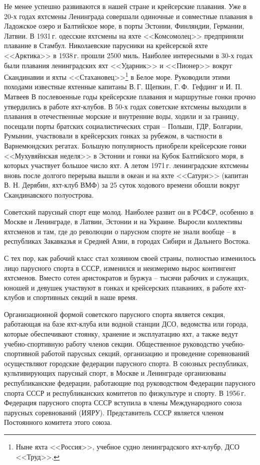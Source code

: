\documentclass[a4paper, 12pt, twoside, final]{scrbook}
\begin{document}
Не менее успешно развиваются в нашей стране и крейсерские плавания.
Уже в 20-х годах яхтсмены Ленинграда совершали одиночные и совместные
плавания в Ладожское озеро и Балтийское море, в порты Эстонии, Финляндии,
Германии, Латвии. В 1931\,г. одесские яхтсмены на яхте <<Комсомолец>>
предприняли плавание в Стамбул. Николаевские парусники на крейсерской
яхте <<Арктика>> в 1938\,г. прошли 2500 миль. Наиболее интересными в
30-х годах были плавания ленинградских яхт <<Ударник>> и <<Пионер>> вокруг
Скандинавии и яхты <<Стахановец>>\footnote{Ныне яхта <<Россия>>, учебное судно ленинградского яхт-клубр, ДСО <<Труд>>.}
в Белое море. Руководили этими походами известные яхтенные капитаны
В.\,Г. Щепкин, Г.\,Ф.~Гефдинг и И. П. Матвеев В послевоенные годы крейсерские
плавания и маршрутные гонки прочно утвердились в работе яхт-клубов.
В 50-х годах советские яхтсмены выходили в плавания в отечественные
морские и внутренние воды, ходили и за границу, посещали порты братских
социалистических стран \--- Польши, ГДР, Болгарии, Румынии, участвовали
в крейсерских гонках за рубежом, в частности в Варнемюндских регатах.
Большую популярность приобрели крейсерские гонки <<Мухувяйнская неделя>>
в Эстонии и гонки на Кубок Балтийского моря, в которых участвует большое
число яхт. А летом 1971\,г. ленинградские яхтсмены вновь после долгого
перерыва вышли в океан и на яхте <<Сатурн>> (капитан В. Н. Дерябин,
яхт-клуб ВМФ) за 25 суток ходового времени обошли вокруг Скандинавского
полуострова. 

Советский парусный спорт еще молод. Наиболее развит он в РСФСР, особенно
в Москве и Ленинграде, в Латвии, Эстонии и на Украине. Выросли коллективы
яхтсменов и там, где до революции о парусном спорте не знали вообще \--- в республиках Закавказья и Средней Азии, в городах Сибири и Дальнего
Востока.

С тех пор, как рабочий класс стал хозяином своей страны, полностью
изменилось лицо парусного спорта в СССР, изменился и неизмеримо вырос
контингент яхтсменов. Вместо сотен аристократов и буржуа \--- тысячи
рабочих и служащих, юношей и девушек участвуют в гонках и крейсерских
плаваниях, в работе яхт-клубов и спортивных секций в наше время.

Организационной формой советского парусного спорта является секция,
работающая на базе яхт-клуба или водной станции ДСО, ведомства или
города, которые обеспечивают стоянку, хранение и эксплуатацию яхт,
а также ведут учебно-спортивную работу членов секции. Общественное
руководство учебно-спортивной работой парусных секций, организацию
и проведение соревнований осуществляют городские федерации парусного
спорта. В союзных республиках, культивирующих парусный спорт, в Москве
и Ленинграде организованы республиканские федерации, работающие под
руководством Федерации парусного спорта СССР и республиканских комитетов
по физкультуре и спорту. В 1956\,г. Федерация парусного спорта СССР
вступила в члены Международного союза парусных соревнований (ИЯРУ).
Представитель СССР является членом Постоянного комитета этого союза.
\end{document}
